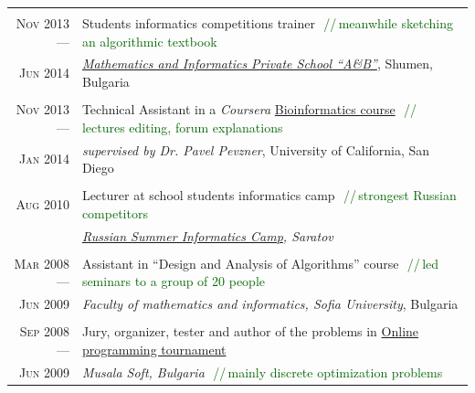\documentclass[a4paper,10pt]{article}
\def\myline{\color{linegray}\vline}
\newcommand{\minorcolor}[1]{\textcolor{mygray}{#1}}
\newcommand{\comment}[1]{\small\textcolor{darkgreen}{\,\,//\,#1}}
\newcommand{\mydate}[1]{\minorcolor{\textsc{#1}}}
\begin{document}
{\begin{tabular}{r!{\myline}p{14cm}}
        \\
        \mydate{Nov 2013 ---}       &   Students informatics competitions trainer
                                        \comment{meanwhile sketching an algorithmic textbook}\\
        \mydate{Jun 2014}           &   \textit{\href{http://ab-bg.com/}{Mathematics and Informatics Private School ``A\&B''}}, Shumen, Bulgaria\\

        \\
        \mydate{Nov 2013 ---}       &   Technical Assistant in a \textit{Coursera} \href{https://www.coursera.org/course/bioinformatics}{Bioinformatics course}
                                        \comment{lectures editing, forum explanations}\\
        \mydate{Jan 2014}           &   \textit{supervised by Dr. Pavel Pevzner}, University of California, San Diego\\

        \\
        \mydate{Aug 2010}           &   Lecturer at school students informatics camp
                                        \comment{strongest Russian competitors}\\
                                    &   \textit{\href{http://lksh.ru/}{Russian Summer Informatics Camp}, Saratov}\\

        \\
        \mydate{Mar 2008 ---}       &   Assistant in ``Design and Analysis of Algorithms'' course
                                        \comment{led seminars to a group of 20 people}\\
        \mydate{Jun 2009}           &   \textit{Faculty of mathematics and informatics, Sofia University}, Bulgaria\\

        \\
        \mydate{Sep 2008 ---}       &   Jury, organizer, tester and author of the problems in \href{http://konkurs.musala.com/}{Online programming tournament}\\
        \mydate{Jun 2009}           &   \textit{Musala Soft, Bulgaria}
                                        \comment{mainly discrete optimization problems}\\


\end{tabular}}
\end{document}
